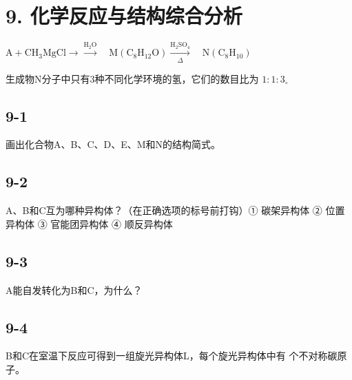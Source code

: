 \section*{9. 化学反应与结构综合分析}
$
\mathrm{A} + \mathrm{CH} _ {3} \mathrm{MgCl} \longrightarrow \xrightarrow {\mathrm{H} _ {2} \mathrm{O}} \quad \mathrm{M} (\mathrm{C} _ {8} \mathrm{H} _ {1 2} \mathrm{O}) \xrightarrow [ \Delta ]{\mathrm{H} _ {2} \mathrm{SO} _ {4}} \quad \mathrm{N} (\mathrm{C} _ {8} \mathrm{H} _ {1 0})
$

⽣成物N分⼦中只有3种不同化学环境的氢，它们的数⽬⽐为 $1 { : } 1 { : } 3 _ { \circ }$

\subsection*{9-1}
画出化合物A、B、C、D、E、M和N的结构简式。

\subsection*{9-2}
A、B和C互为哪种异构体？（在正确选项的标号前打钩）① 碳架异构体 ② 位置异构体 ③ 官能团异构体 ④ 顺反异构体

\subsection*{9-3}
A能⾃发转化为B和C，为什么？

\subsection*{9-4}
B和C在室温下反应可得到⼀组旋光异构体L，每个旋光异构体中有 个不对称碳原⼦。

